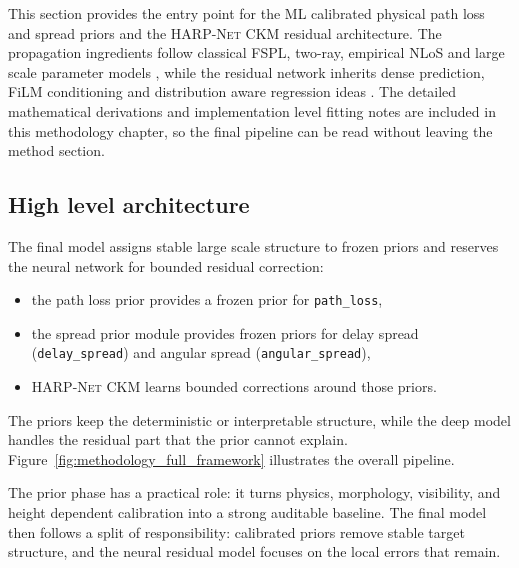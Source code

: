 This section provides the entry point for the ML calibrated physical
path loss and spread priors and the \textsc{HARP-Net CKM} residual architecture.
The propagation ingredients follow classical FSPL, two-ray,
empirical NLoS and large scale parameter models
\cite{rappaport,wocc2021,cost231,tr38901,winner2,khawaja_survey}, while the
residual network inherits dense prediction, FiLM conditioning and
distribution aware regression ideas
\cite{pmnet2023,perez2018film,kendall2017uncertainties,saleh2021probabilistic}.
The detailed mathematical derivations and implementation level fitting notes
are included in this methodology chapter, so the final pipeline can be read
without leaving the method section.

\subsection{High level architecture}

The final model assigns stable large scale structure to frozen priors and
reserves the neural network for bounded residual correction:

\begin{itemize}
\setlength{\itemsep}{0.12em}
\setlength{\parsep}{0pt}
\setlength{\topsep}{0.15em}
\item the path loss prior provides a frozen prior for \texttt{path\_loss},
\item the spread prior module provides frozen priors for delay spread
      (\texttt{delay\_spread}) and angular spread
      (\texttt{angular\_spread}),
\item \textsc{HARP-Net CKM} learns bounded corrections around those priors.
\end{itemize}

The priors keep the deterministic or interpretable structure, while the deep
model handles the residual part that the prior cannot explain.
Figure~\ref{fig:methodology_full_framework} illustrates the overall pipeline.

The prior phase has a practical role: it turns physics, morphology, visibility,
and height dependent calibration into a strong auditable baseline. The final
model then follows a split of responsibility: calibrated priors remove stable
target structure, and the neural residual model focuses on the local errors that
remain.

